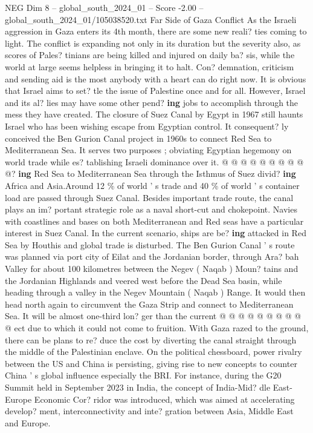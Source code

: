 \begin{textsample}{NEG Dim 8 – global\_south\_2024\_01 – Score -2.00 – global\_south\_2024\_01/105038520.txt}  \label{ex:f8_neg_051}
Far Side of Gaza Conflict As the Israeli aggression in Gaza enters its 4th month, there are some new reali? ties coming to light.
The conflict is expanding not only in its duration but the severity also, as scores of Pales? tinians are being killed and injured on daily ba? sis, while the world at large seems helpless in bringing it to halt.
Con? demnation, criticism and sending aid is the most anybody with a heart can do right now.
It is obvious that Israel aims to set? tle the issue of Palestine once and for all.
However, Israel and its al? lies may have some other pend? \textbf{ing} jobs to accomplish through the mess they have created.
The closure of Suez Canal by Egypt in 1967 still haunts Israel who has been wishing escape from Egyptian control.
It consequent? ly conceived the Ben Gurion Canal project in 1960s to connect Red Sea to Mediterranean Sea.
It serves two purposes ; obviating Egyptian hegemony on world trade while es? tablishing Israeli dominance over it. @ @ @ @ @ @ @ @ @ @? \textbf{ing} Red Sea to Mediterranean Sea through the Isthmus of Suez divid? \textbf{ing} Africa and Asia.Around 12 \% of world ' s trade and 40 \% of world ' s container load are passed through Suez Canal.
Besides important trade route, the canal plays an im? portant strategic role as a naval short-cut and chokepoint.
Navies with coastlines and bases on both Mediterranean and Red seas have a particular interest in Suez Canal.
In the current scenario, ships are be? \textbf{ing} attacked in Red Sea by Houthis and global trade is disturbed.
The Ben Gurion Canal ' s route was planned via port city of Eilat and the Jordanian border, through Ara? bah Valley for about 100 kilometres between the Negev ( Naqab ) Moun? tains and the Jordanian Highlands and veered west before the Dead Sea basin, while heading through a valley in the Negev Mountain ( Naqab ) Range.
It would then head north again to circumvent the Gaza Strip and connect to Mediterranean Sea.
It will be almost one-third lon? ger than the current @ @ @ @ @ @ @ @ @ @ ect due to which it could not come to fruition.
With Gaza razed to the ground, there can be plans to re? duce the cost by diverting the canal straight through the middle of the Palestinian enclave.
On the political chessboard, power rivalry between the US and China is persisting, giving rise to new concepts to counter China ' s global influence especially the BRI.
For instance, during the G20 Summit held in September 2023 in India, the concept of India-Mid? dle East-Europe Economic Cor? ridor was introduced, which was aimed at accelerating develop? ment, interconnectivity and inte? gration between Asia, Middle East and Europe.

\end{textsample}
